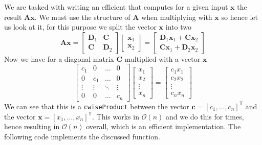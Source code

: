 \documentclass{article}
\begin{document}
\noindent We are tasked with writing an efficient that computes for a given input $\mathbf{x}$ the result $\mathbf{A}\mathbf{x}$. We must use the structure of $\mathbf{A}$ when multiplying with $\mathbf{x}$ so hence let us look at it, for this purpose we split the vector $\mathbf{x}$ into two 
\begin{equation*}
\mathbf{A}\mathbf{x} = 
    \begin{bmatrix}
        \mathbf{D}_{1} & \mathbf{C} \\
        \mathbf{C} & \mathbf{D}_{2}
    \end{bmatrix}
    \begin{bmatrix}
        \mathbf{x}_{1} \\
        \mathbf{x}_{2}
    \end{bmatrix} = \begin{bmatrix}
        \mathbf{D}_{1}\mathbf{x}_{1} + \mathbf{C}\mathbf{x}_{2} \\
        \mathbf{C}\mathbf{x}_{1} + \mathbf{D}_{2}\mathbf{x}_{2}
    \end{bmatrix}
\end{equation*}
Now we have for a diagonal matrix $\mathbf{C}$ multiplied with a vector $\mathbf{x}$
\begin{equation*}
    \begin{bmatrix}
        c_{1} & 0 & \dots & 0 \\
        0 & c_{1} & \dots & 0 \\
        \vdots & \vdots & \ddots& \vdots \\
        0 & 0 & \dots & c_{n}
    \end{bmatrix} \begin{bmatrix}
        x_{1} \\ x_{2} \\ \vdots \\ x_{n}
    \end{bmatrix} = \begin{bmatrix}
        c_{1}x_{1} \\
        c_{2}x_{2} \\
        \vdots \\
        c_{n}x_{n}
    \end{bmatrix}
\end{equation*}
We can see that this is a \verb|cwiseProduct| between the vector $\mathbf{c} = \left[c_{1}, \dots, c_{n}\right]^{\mathsf{T}}$ and the vector $\mathbf{x} = \left[x_{1}, \dots, x_{n}\right]^{\mathsf{T}}$. This works in $\mathcal{O}\left(n\right)$ and we do this for times, hence resulting in $\mathcal{O}\left(n\right)$ overall, which is an efficient implementation. The following code implements the discussed function.
\end{document}
